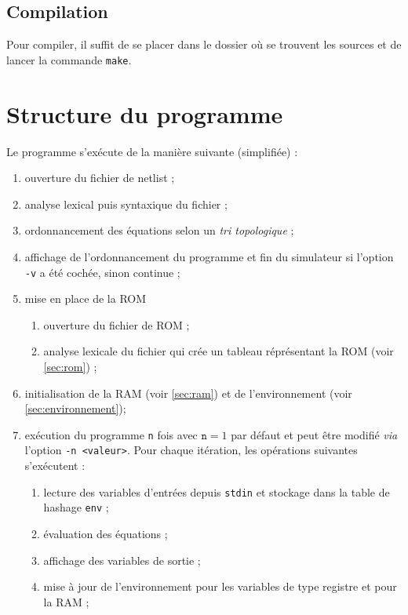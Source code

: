 \documentclass{article}
\newcommand{\code}[1]{\colorbox{White}{\texttt{#1}}}
\begin{document}
\subsection{Compilation}
Pour compiler, il suffit de se placer dans le dossier où se trouvent
les sources et de lancer la commande \code{make}.

\section{Structure du programme}
Le programme s'exécute de la manière suivante (simplifiée) :
\begin{enumerate}
  \item ouverture du fichier de netlist ;
  \item analyse lexical puis syntaxique du fichier ;
  \item ordonnancement des équations selon un \emph{tri topologique} ;
  \item affichage de l'ordonnancement du programme et fin du
    simulateur si l'option \texttt{-v} a été cochée, sinon continue ;
  \item mise en place de la ROM
    \begin{enumerate}
    \item ouverture du fichier de ROM ;
    \item analyse lexicale du fichier qui crée un tableau réprésentant
      la ROM (voir \ref{sec:rom}) ;
    \end{enumerate}
  \item initialisation de la RAM (voir \ref{sec:ram}) et de
    l'environnement (voir \ref{sec:environnement});
  \item exécution du programme \texttt{n} fois avec $\texttt{n} = 1$ par
    défaut et peut être modifié \emph{via} l'option \texttt{-n
      <valeur>}. Pour chaque itération, les opérations suivantes
    s'exécutent :
    \begin{enumerate}
      \item lecture des variables d'entrées depuis \texttt{stdin} et
        stockage dans la table de hashage \texttt{env} ;
      \item évaluation des équations \label{evaluation};
      \item affichage des variables de sortie ;
      \item mise à jour de l'environnement pour les variables de type
        registre et pour la RAM \label{eoc};
    \end{enumerate}
\end{enumerate}
\end{document}
